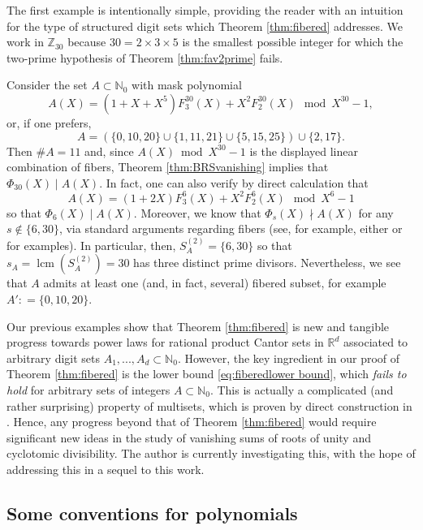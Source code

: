 \documentclass[12pt]{amsart}
\numberwithin{equation}{section}
\DeclareMathOperator{\lcm}{lcm}
\begin{document}
The first example is intentionally simple, providing the reader with an intuition for the type of structured digit sets which Theorem \ref{thm:fibered} addresses. We work in $\mathbb{Z}_{30}$ because $30 = 2 \times 3 \times 5$ is the smallest possible integer for which the two-prime hypothesis of Theorem \ref{thm:fav2prime} fails.

\begin{example}
\rm{
Consider the set $A \subset \mathbb{N}_0$ with mask polynomial
$$
A(X) = (1 + X +X^5)F_3^{30} (X) + X^2F_2^{30} (X) \mod X^{30} - 1,
$$
or, if one prefers,
$$
A = (\{0,10,20\} \cup \{1,11,21\} \cup  \{5,15,25\}) \cup \{2,17\}.
$$
Then $\# A = 11$ and, since $A(X) \bmod X^{30} - 1$ is the displayed linear combination of fibers, Theorem \ref{thm:BRSvanishing} implies that $\Phi_{30} (X) \mid A (X)$. In fact, one can also verify by direct calculation that
$$
A(X) = (1 + 2X)F_3^{6} (X) + X^2 F_2^6 (X) \mod X^6 - 1
$$
so that $\Phi_{6} (X) \mid A(X)$.
Moreover, we know that $\Phi_{s} (X) \nmid A(X)$ for any $s \not \in \{6, 30\}$, via standard arguments regarding fibers (see, for example, either \cite[Section 2]{KLMS} or \cite[Section 5]{LM} for examples). In particular, then, $S_A^{(2)} = \{6,30\}$ so that $s_A = \lcm (S_A^{(2)}) = 30$ has three distinct prime divisors. Nevertheless, we see that $A$ admits at least one (and, in fact, several) fibered subset, for example $A' : =\{0,10,20 \}$.
}
\end{example}

Our previous examples show that Theorem \ref{thm:fibered} is new and tangible progress towards power laws for rational product Cantor sets in $\mathbb{R}^d$ associated to arbitrary digit sets $A_1,...,A_d \subset \mathbb{N}_0$. However, the key ingredient in our proof of Theorem \ref{thm:fibered} is the lower bound \eqref{eq:fiberedlower bound}, which \textit{fails to hold} for arbitrary sets of integers $A \subset \mathbb{N}_{0}$. This is actually a complicated (and rather surprising) property of multisets, which is proven by direct construction in \cite[Theorem 1.3]{KLMS}. Hence, any progress beyond that of Theorem \ref{thm:fibered} would require significant new ideas in the study of vanishing sums of roots of unity and cyclotomic divisibility. The author is currently investigating this, with the hope of addressing this in a sequel to this work.

\subsection*{Some conventions for polynomials}
\end{document}
